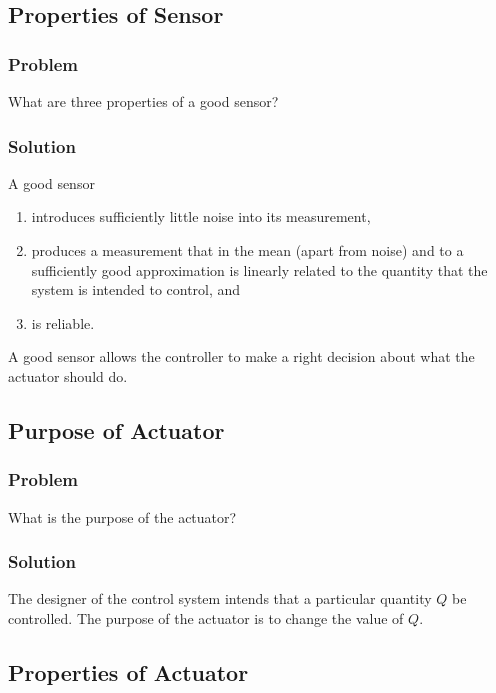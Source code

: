 \subsection{Properties of Sensor}

\subsubsection{Problem}

What are three properties of a good sensor?

\subsubsection{Solution}

A good sensor
\begin{enumerate}
   \item introduces sufficiently little noise into its measurement,
   \item produces a measurement that in the mean (apart from noise) and to a
      sufficiently good approximation is linearly related to the quantity that
      the system is intended to control, and
   \item is reliable.
\end{enumerate}
A good sensor allows the controller to make a right decision about what the
actuator should do.

\subsection{Purpose of Actuator}

\subsubsection{Problem}

What is the purpose of the actuator?

\subsubsection{Solution}

The designer of the control system intends that a particular quantity $Q$ be
controlled. The purpose of the actuator is to change the value of $Q$.

\subsection{Properties of Actuator}


